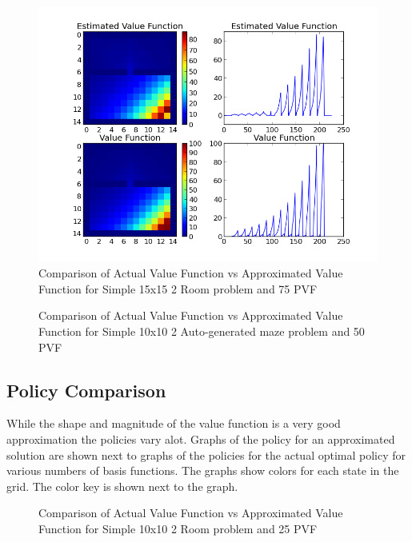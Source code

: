 \documentclass[12pt, letterpaper, final]{report}
\begin{document}
\FloatBarrier
\begin{figure}[h!]
\centering
\includegraphics[scale=.5]{images/paper_example_big_V_function_comparison_k75_s5000_graph01.png}
\caption{Comparison of Actual Value Function vs Approximated Value
  Function for Simple 15x15 2 Room problem and 75 PVF}
\label{valueVsQ2}
\end{figure}
\FloatBarrier

\FloatBarrier
\begin{figure}[h!]
\centering

\caption{Comparison of Actual Value Function vs Approximated Value
  Function for Simple 10x10 2 Auto-generated maze problem and 50 PVF}
\label{valueVsQ3}
\end{figure}
\FloatBarrier

\subsection*{Policy Comparison}

While the shape and magnitude of the value function is a very good
approximation the policies vary alot. Graphs of the policy for an
approximated solution are shown next to graphs of the policies for the
actual optimal policy for various numbers of basis functions. The graphs show colors for each state in the
grid. The color key is shown next to the graph.

\FloatBarrier
\begin{figure}[h!]
\centering
\caption{Comparison of Actual Value Function vs Approximated Value
  Function for Simple 10x10 2 Room problem and 25 PVF}
\label{valueVsQ1}
\end{figure}
\FloatBarrier
\end{document}
